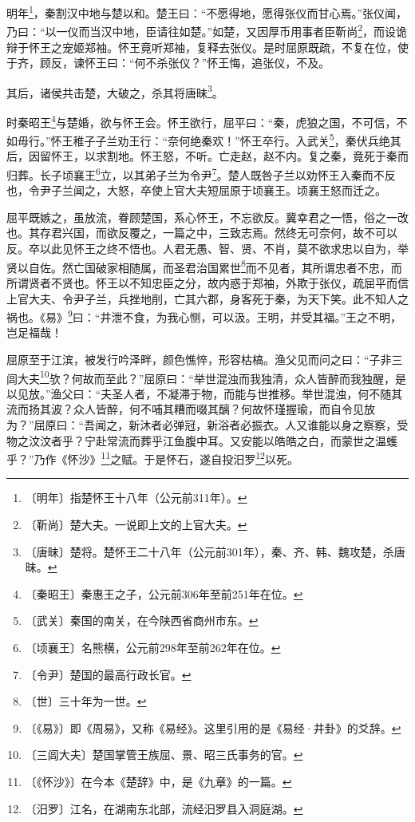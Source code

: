 \documentclass[12pt,UTF-8,openany,a4]{ctexbook}
\begin{document}
\begin{large}
    明年\footnote{〔明年〕\yiwen 指楚怀王十八年（公元前311年）。}，秦割汉中地与楚以和。楚王曰：“不愿得地，愿得张仪而甘心焉。”张仪闻，乃曰：“以一仪而当汉中地，臣请往如楚。”如楚，又因厚币用事者臣靳尚\footnote{〔靳尚〕\yiwen 楚大夫。一说即上文的上官大夫。}，而设诡辩于怀王之宠姬郑袖。怀王竟听郑袖，复释去张仪。是时屈原既疏，不复在位，使于齐，顾反，谏怀王曰：“何不杀张仪？”怀王悔，追张仪，不及。
    
    其后，诸侯共击楚，大破之，杀其将唐昧\footnote{〔唐昧〕\yiwen 楚将。楚怀王二十八年（公元前301年），秦、齐、韩、魏攻楚，杀唐昧。}。
    
    时秦昭王\footnote{〔秦昭王〕\yiwen 秦惠王之子，公元前306年至前251年在位。}与楚婚，欲与怀王会。怀王欲行，屈平曰：“秦，虎狼之国，不可信，不如毋行。”怀王稚子子兰劝王行：“奈何绝秦欢！”怀王卒行。入武关\footnote{〔武关〕\yiwen 秦国的南关，在今陕西省商州市东。}，秦伏兵绝其后，因留怀王，以求割地。怀王怒，不听。亡走赵，赵不内。复之秦，竟死于秦而归葬。长子顷襄王\footnote{〔顷襄王〕\yiwen 名熊横，公元前298年至前262年在位。}立，以其弟子兰为令尹\footnote{〔令尹〕\yiwen 楚国的最高行政长官。}。楚人既咎子兰以劝怀王入秦而不反也，令尹子兰闻之，大怒，卒使上官大夫短屈原于顷襄王。顷襄王怒而迁之。
    
    屈平既嫉之，虽放流，眷顾楚国，系心怀王，不忘欲反。冀幸君之一悟，俗之一改也。其存君兴国，而欲反覆之，一篇之中，三致志焉。然终无可奈何，故不可以反。卒以此见怀王之终不悟也。人君无愚、智、贤、不肖，莫不欲求忠以自为，举贤以自佐。然亡国破家相随属，而圣君治国累世\footnote{〔世〕\yiwen 三十年为一世。}而不见者，其所谓忠者不忠，而所谓贤者不贤也。怀王以不知忠臣之分，故内惑于郑袖，外欺于张仪，疏屈平而信上官大夫、令尹子兰，兵挫地削，亡其六郡，身客死于秦，为天下笑。此不知人之祸也。《易》\footnote{〔《易》〕\yiwen 即《周易》，又称《易经》。这里引用的是《易经·井卦》的爻辞。}曰：“井泄不食，为我心恻，可以汲。王明，并受其福。”王之不明，岂足福哉！
    
    屈原至于江滨，被发行吟泽畔，颜色憔悴，形容枯槁。渔父见而问之曰：“子非三闾大夫\footnote{〔三闾大夫〕\yiwen 楚国掌管王族屈、景、昭三氏事务的官。}欤？何故而至此？”屈原曰：“举世混浊而我独清，众人皆醉而我独醒，是以见放。”渔父曰：“夫圣人者，不凝滞于物，而能与世推移。举世混浊，何不随其流而扬其波？众人皆醉，何不哺其糟而啜其醨？何故怀瑾握瑜，而自令见放为？”屈原曰：“吾闻之，新沐者必弹冠，新浴者必振衣。人又谁能以身之察察，受物之汶汶者乎？宁赴常流而葬乎江鱼腹中耳。又安能以皓皓之白，而蒙世之温蠖乎？”乃作《怀沙》\footnote{〔《怀沙》〕\yiwen 在今本《楚辞》中，是《九章》的一篇。}之赋。于是怀石，遂自投汨罗\footnote{〔汨罗〕\yiwen 江名，在湖南东北部，流经汨罗县入洞庭湖。}以死。
    

\end{large}
\end{document}
